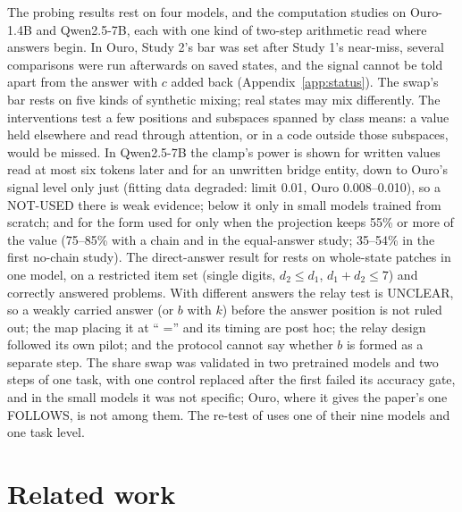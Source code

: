 \documentclass{article}
\begin{document}
The probing results rest on four models, and the computation studies on Ouro-1.4B and Qwen2.5-7B, each with one kind of two-step arithmetic read where answers begin. In Ouro, Study 2's bar was set after Study 1's near-miss, several comparisons were run afterwards on saved states, and the signal cannot be told apart from the answer with $c$ added back (Appendix~\ref{app:status}). The swap's bar rests on five kinds of synthetic mixing; real states may mix differently. The interventions test a few positions and subspaces spanned by class means: a value held elsewhere and read through attention, or in a code outside those subspaces, would be missed. In Qwen2.5-7B the clamp's power is shown for written values read at most six tokens later and for an unwritten bridge entity, down to Ouro's signal level only just (fitting data degraded: limit 0.01, Ouro 0.008--0.010), so a NOT-USED there is weak evidence; below it only in small models trained from scratch; and for the form used for \citet{kudo2026} only when the projection keeps 55\% or more of the value (75--85\% with a chain and in the equal-answer study; 35--54\% in the first no-chain study). The direct-answer result for \citet{kudo2026} rests on whole-state patches in one model, on a restricted item set (single digits, $d_2 \le d_1$, $d_1 + d_2 \le 7$) and correctly answered problems. With different answers the relay test is UNCLEAR, so a weakly carried answer (or $b$ with $k$) before the answer position is not ruled out; the map placing it at `` ='' and its timing are post hoc; the relay design followed its own pilot; and the protocol cannot say whether $b$ is formed as a separate step. The share swap was validated in two pretrained models and two steps of one task, with one control replaced after the first failed its accuracy gate, and in the small models it was not specific; Ouro, where it gives the paper's one FOLLOWS, is not among them. The re-test of \citet{kudo2026} uses one of their nine models and one task level.

\section{Related work}\label{sec:related}
\end{document}
